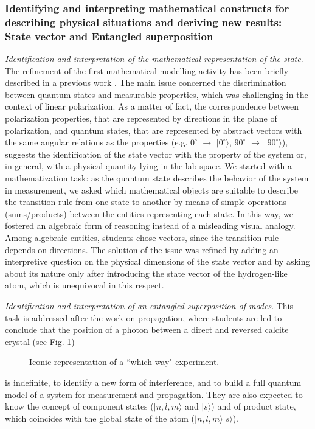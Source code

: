 \documentclass[twocolumn,secnumarabic,amssymb, nobibnotes, aps, prd, nofootinbib]{revtex4-2}
\begin{document}
\subsubsection{Identifying and interpreting mathematical constructs for describing physical situations and deriving new results: State vector and Entangled superposition} \label{Sec:3.4.5}

\emph{Identification and interpretation of the mathematical representation of the state}. The refinement of the first mathematical modelling activity has been briefly described in a previous work \cite{Pospiech2021}. The main issue concerned the discrimination between quantum states and measurable properties, which was challenging in the context of linear polarization. As a matter of fact, the correspondence between polarization properties, that are represented by directions in the plane of polarization, and quantum states, that are represented by abstract vectors with the same angular relations as the properties (e.g. $0^{\circ}$ $\rightarrow$ $|0^{\circ}\rangle$, $90^{\circ}$ $\rightarrow$ $|90^{\circ}\rangle$), suggests the identification of the state vector with the property of the system or, in general, with a physical quantity lying in the lab space. We started with a mathematization task: as the quantum state describes the behavior of the system in measurement, we asked which mathematical objects are suitable to describe the transition rule from one state to another by means of simple operations (sums/products) between the entities representing each state. In this way, we fostered an algebraic form of reasoning instead of a misleading visual analogy. Among algebraic entities, students chose vectors, since the transition rule depends on directions. The solution of the issue was refined by adding an interpretive question on the physical dimensions of the state vector and by asking about its nature only after introducing the state vector of the hydrogen-like atom, which is unequivocal in this respect.


\emph{Identification and interpretation of an entangled superposition of modes}. This task is addressed after the work on propagation, where students are led to conclude that the position of a photon between a direct and reversed calcite crystal (see Fig. \ref{FIG:8})
\begin{figure}
    \caption{Iconic representation of a ``which-way" experiment.}
    \label{FIG:8}
\end{figure}
is indefinite, to identify a new form of interference, and to build a full quantum model of a system for measurement and propagation. They are also expected to know the concept of component states ($|n, l, m \rangle$ and $|s\rangle$) and of product state, which coincides with the global state of the atom ($|n, l, m \rangle |s\rangle$).
\end{document}
